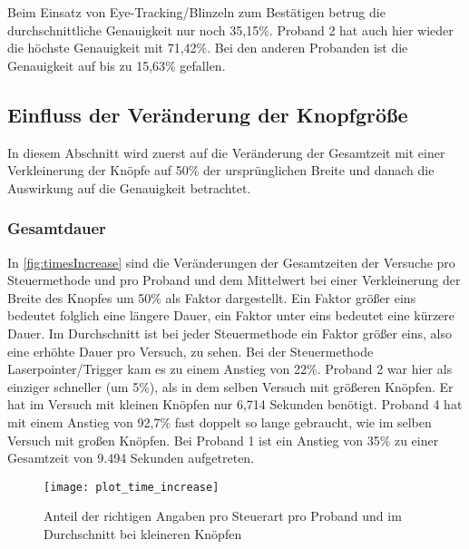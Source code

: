 Beim Einsatz von Eye-Tracking/Blinzeln zum Bestätigen betrug die durchschnittliche Genauigkeit nur noch 35,15\%. Proband 2 hat auch hier wieder die höchste Genauigkeit mit 71,42\%. Bei den anderen Probanden ist die Genauigkeit auf bis zu 15,63\% gefallen. 



\subsection{Einfluss der Veränderung der Knopfgröße}
\label{section:influencebuttonsize}
In diesem Abschnitt wird zuerst auf die Veränderung der Gesamtzeit mit einer Verkleinerung der Knöpfe auf 50\% der ursprünglichen Breite und danach die Auswirkung auf die Genauigkeit betrachtet. 
\subsubsection{Gesamtdauer}
In \autoref{fig:timesIncrease} sind die Veränderungen der Gesamtzeiten der Versuche pro Steuermethode und pro Proband und dem Mittelwert bei einer Verkleinerung der Breite des Knopfes um 50\% als Faktor dargestellt. Ein Faktor größer eins bedeutet folglich eine längere Dauer, ein Faktor unter eins bedeutet eine kürzere Dauer. Im Durchschnitt ist bei jeder Steuermethode ein Faktor größer eins, also eine erhöhte Dauer pro Versuch, zu sehen. Bei der Steuermethode Laserpointer/Trigger kam es zu einem Anstieg von 22\%. Proband 2 war hier als einziger schneller (um 5\%), als in dem selben Versuch mit größeren Knöpfen. Er hat im Versuch mit kleinen Knöpfen nur 6,714 Sekunden benötigt. Proband 4 hat mit einem Anstieg von 92,7\% fast doppelt so lange gebraucht, wie im selben Versuch mit großen Knöpfen. Bei Proband 1 ist ein Anstieg von 35\% zu einer Gesamtzeit von 9.494 Sekunden aufgetreten.

\begin{figure}[!htbp]
	\centering
	\texttt{[image: plot\_time\_increase]}
	\caption[Anteil der richtigen Angaben pro Steuerart pro Proband und im Durchschnitt bei kleineren Knöpfen]{Anteil der richtigen Angaben pro Steuerart pro Proband und im Durchschnitt bei kleineren Knöpfen}
	\label{fig:timesIncrease}
\end{figure}

